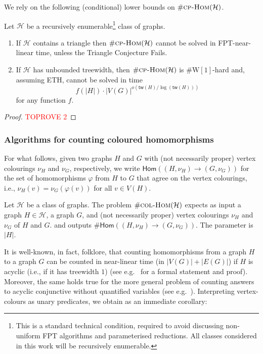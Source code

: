 \documentclass[authorcolumns,numberwithinsect]{no-lipics-v2022}
\newcommand{\homs}[2]{\mathsf{Hom}(#1 \to #2)}
\newcommand{\W}{\mathrm{W}}
\newcommand{\cphomsprob}{\text{\sc{cp-Hom}}}
\newcommand{\colhomsprob}{\text{\sc{col-Hom}}}
\begin{document}
We rely on the following (conditional) lower bounds on $\#\cphomsprob(\mathcal{H})$.

\begin{lemma}\label{lem:cphom_lower_bounds}
    Let $\mathcal{H}$ be a recursively enumerable\footnote{This is a standard technical condition, required to avoid discussing non-uniform FPT algorithms and parameterised reductions. All classes considered in this work will be recursively enumerable.} class of graphs.
    \begin{enumerate}
        \item If $\mathcal{H}$ contains a triangle then $\#\cphomsprob(\mathcal{H})$ cannot be solved in FPT-near-linear time, unless the Triangle Conjecture Fails.
        \item If $\mathcal{H}$ has unbounded treewidth, then $\#\cphomsprob(\mathcal{H})$ is $\#\W[1]$-hard and, assuming ETH, cannot be solved in time \[f(|H|)\cdot |V(G)|^{o(\mathsf{tw}(H)/\log(\mathsf{tw}(H)))}\]
        for any function $f$.
    \end{enumerate}
\end{lemma}
\begin{proof}\textcolor{red}{TOPROVE 2}\end{proof}


\subsubsection{Algorithms for counting coloured homomorphisms}\label{sec:algo_count_col_homs}
For what follows, given two graphs $H$ and $G$ with (not necessarily proper) vertex colourings $\nu_H$ and $\nu_G$, respectively, we write $\homs{(H,\nu_H)}{(G,\nu_G)}$ for the set of homomorphisms $\varphi$ from $H$ to $G$ that agree on the vertex colourings, i.e., $\nu_H(v)=\nu_G(\varphi(v))$ for all $v\in V(H)$. 

\begin{definition}[$\#\colhomsprob(\mathcal{H})$]
    Let $\mathcal{H}$ be a class of graphs. The problem $\#\colhomsprob(\mathcal{H})$ expects as input a graph $H\in \mathcal{H}$, a graph $G$, and (not necessarily proper) vertex colourings $\nu_H$ and $\nu_G$ of $H$ and $G$. and outputs $\#\homs{(H,\nu_H)}{(G,\nu_G)}$. The parameter is $|H|$.
\end{definition}

It is well-known, in fact, folklore, that counting homomorphisms from a graph $H$ to a graph $G$ can be counted in near-linear time (in $|V(G)|+ |E(G)|$) if $H$ is acyclic (i.e., if it has treewidth $1$) (see e.g.\ \cite[Theorem 7]{BeraGLSS22} for a formal statement and proof). Moreover, the same holds true for the more general problem of counting answers to acyclic conjunctive without quantified variables (see e.g.\ \cite[Theorem 12]{BraultBaron13}). Interpreting vertex-colours as unary predicates, we obtain as an immediate corollary:
\end{document}
